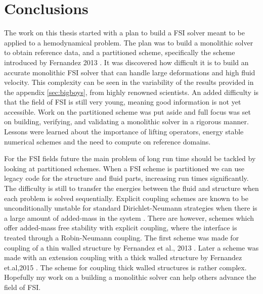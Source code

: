 \chapter{Conclusions}
The work on this thesis started with a plan to build a FSI solver meant to be applied to a hemodynamical problem. The plan was to build a monolithic solver to obtain reference data, and a partitioned scheme, specifically the scheme introduced by Fernandez 2013 \cite{Fernandez2013}. It was discovered how difficult it is to build an accurate monolithic FSI solver that can handle large deformations and high fluid velocity. This complexity can be seen in the variability of the results provided in the appendix \ref{sec:bigboys}, from highly renowned scientists. An added difficulty is that the field of FSI is still very young, meaning good information is not yet accessible. Work on the partitioned scheme was put aside and full focus was set on building, verifying, and validating a monolithic solver in a rigorous manner. Lessons were learned about the importance of lifting operators, energy stable numerical schemes and the need to compute on reference domains.

For the FSI fields future the main problem of long run time should be tackled by looking at partitioned schemes. When a FSI scheme is partitioned we can use legacy code for the structure and fluid parts, increasing run times significantly. The difficulty is still to transfer the energies between the fluid and structure when each problem is solved sequentially. Explicit coupling schemes are known to be unconditionally unstable for standard Dirichlet-Neumann strategies when there is a large amount of added-mass in the system \cite{Fernandez2015, VanBrummelen2009}. There are however, schemes which offer added-mass free stability with explicit coupling, where the interface is treated through a Robin-Neumann coupling. The first scheme was made for coupling of a thin walled structure by Fernandez et al., 2013 \cite{Fernandez2013}. Later a scheme was made with an extension coupling with a thick walled structure by Fernandez et.al,2015 \cite{Fernandez2015}. The scheme for coupling thick walled structures is rather complex. Hopefully my work on a building a monolithic solver can help others advance the field of FSI. 

